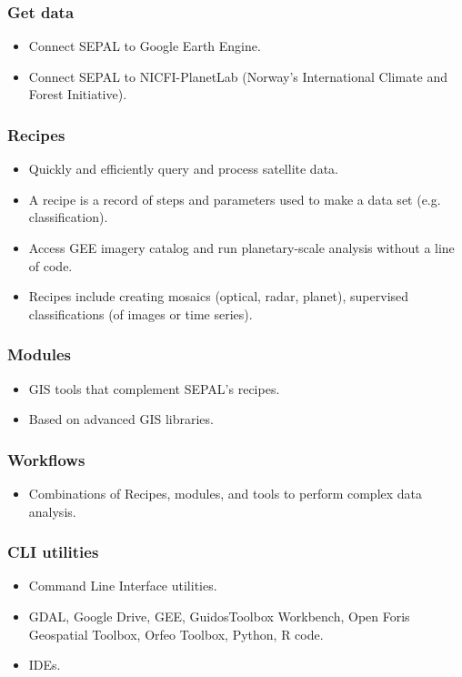 \documentclass[aspectratio=169]{beamer}
\begin{document}
\begin{frame}
    \frametitle{Get data}
    \begin{itemize}
        \item Connect SEPAL to Google Earth Engine.
        \item Connect SEPAL to NICFI-PlanetLab (Norway's International Climate 
            and Forest Initiative).
    \end{itemize}
\end{frame}

\begin{frame}
    \frametitle{Recipes}
    \begin{itemize}
        \item Quickly and efficiently query and process satellite data.
        \item A recipe is a record of steps and parameters used to make a 
            data set (e.g. classification).
        \item Access GEE imagery catalog and run planetary-scale analysis 
            without a line of code.
        \item Recipes include creating mosaics (optical, radar, planet), 
            supervised classifications (of images or time series).
    \end{itemize}
\end{frame}

\begin{frame}
    \frametitle{Modules}
    \begin{itemize}
        \item GIS tools that complement SEPAL's recipes.
        \item Based on advanced GIS libraries.
    \end{itemize}
\end{frame}

\begin{frame}
    \frametitle{Workflows}
    \begin{itemize}
        \item Combinations of Recipes, modules, and tools to perform complex
            data analysis.
    \end{itemize}
\end{frame}

\begin{frame}
    \frametitle{CLI utilities}
    \begin{itemize}
        \item Command Line Interface utilities.
        \item GDAL, Google Drive, GEE, GuidosToolbox Workbench, Open Foris 
            Geospatial Toolbox, Orfeo Toolbox, Python, R code.
        \item IDEs.
    \end{itemize}
\end{frame}
\end{document}
